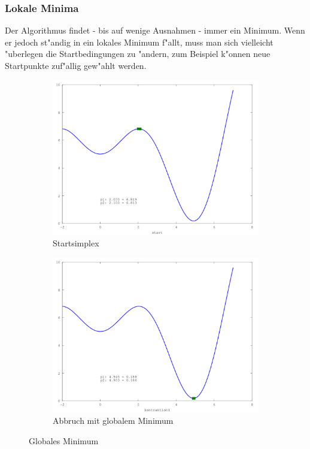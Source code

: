 \subsubsection{Lokale Minima}
Der Algorithmus findet - bis auf wenige Ausnahmen - immer ein
Minimum. Wenn er jedoch st"andig in ein lokales Minimum f"allt, muss
man sich vielleicht "uberlegen die Startbedingungen zu "andern,
zum Beispiel k"onnen neue Startpunkte zuf"allig gew"ahlt werden.


\begin{figure}[htb]
\centering
\begin{subfigure}[b]{0.49\textwidth}
\centering
\includegraphics[width=\textwidth]{downhill/glob_sinx_x001.png}
\caption{Startsimplex}
\end{subfigure} \begin{subfigure}[b]{0.49\textwidth}
\centering
\includegraphics[width=\textwidth]{downhill/glob_sinx_x010.png}
\caption{Abbruch mit globalem Minimum}
\end{subfigure}
\caption{Globales Minimum}
\label{fig:downhillGlobMinima}
\end{figure}


